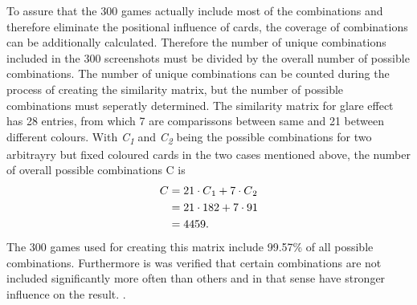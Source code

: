 To assure that the 300 games actually include most of the combinations and therefore eliminate the positional influence of cards, the coverage of combinations can be additionally calculated. Therefore the number of unique combinations included in the 300 screenshots must be divided by the overall number of possible combinations. The number of unique combinations can be counted during the process of creating the similarity matrix, but the number of possible combinations must seperatly determined. The similarity matrix for glare effect has 28 entries, from which 7 are comparissons between same and 21 between different colours. With \textit{C\textsubscript{1}} and \textit{C\textsubscript{2}}  being the possible combinations for two arbitrayry but fixed coloured cards in the two cases mentioned above, the number of overall possible combinations C is
\begin{align*}
	C &= 21 \cdot C\textsubscript{1} + 7 \cdot C\textsubscript{2}\\
	&= 21 \cdot 182 + 7 \cdot 91\\
	&= 4459. 
\end{align*}
The 300 games used for creating this matrix include 99.57\% of all possible combinations. Furthermore is was verified that certain combinations are not included significantly more often than others and in that sense have stronger influence on the result. . 

